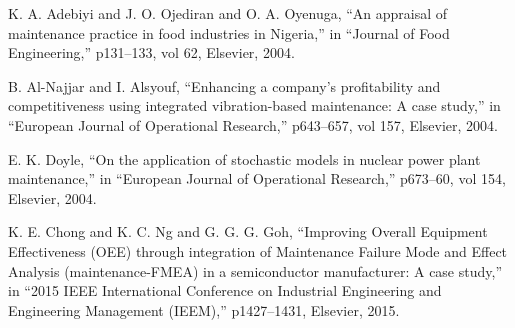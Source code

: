 \documentclass[conference]{IEEEtran}
\begin{document}
\begin{thebibliography}{00}
	 K. A. Adebiyi and J. O. Ojediran and O. A. Oyenuga, ``An appraisal of maintenance practice in food industries in Nigeria,'' in ``Journal of Food Engineering,'' p131--133, vol 62, Elsevier, 2004.

	 B. Al-Najjar and I. Alsyouf, ``Enhancing a company's profitability and competitiveness using integrated vibration-based maintenance: A case study,'' in ``European Journal of Operational Research,'' p643--657, vol 157, Elsevier, 2004.

	 E. K. Doyle, ``On the application of stochastic models in nuclear power plant maintenance,'' in ``European Journal of Operational Research,'' p673--60, vol 154, Elsevier, 2004.

	 K. E. Chong and K. C. Ng and G. G. G. Goh, ``Improving Overall Equipment Effectiveness (OEE) through integration of Maintenance Failure Mode and Effect Analysis (maintenance-FMEA) in a semiconductor manufacturer: A case study,'' in ``2015 IEEE International Conference on Industrial Engineering and Engineering Management (IEEM),'' p1427--1431, Elsevier, 2015.
	
\end{thebibliography}
\end{document}
